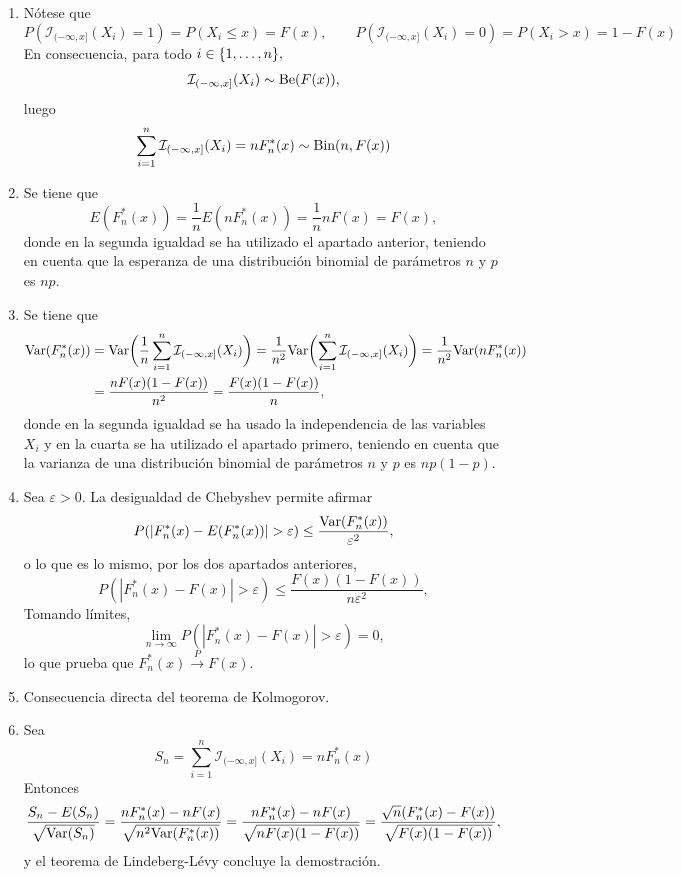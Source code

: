 \documentclass[11pt]{report}
\makeatletter
\renewenvironment{proof}[1][\proofname]{\par
  \pushQED{\qed}%
  \normalfont \topsep\z@skip %
  \trivlist
  \item[\hskip\labelsep
        \itshape
    #1\@addpunct{.}]\ignorespaces
}{%
  \popQED\endtrivlist\@endpefalse
}
\theoremstyle{definition}
\makeatother
\begin{document}
\begin{proof}
\hfill
    \begin{enumerate}
        \item Nótese que
        \[P(\mathcal{I}_{(-\infty,x]}(X_i)=1) = P(X_i \leq x) = F(x), \qquad P(\mathcal{I}_{(-\infty,x]}(X_i)=0) = P(X_i > x) = 1-F(x)\]
        En consecuencia, para todo $i \in \{1,\mathellipsis,n\},$
        \[\mathcal{I}_{(-\infty,x]}(X_i) \sim \textup{Be}(F(x)),\]
        luego
        \[\sum_{i=1}^n\mathcal{I}_{(-\infty,x]}(X_i) = nF_n^*(x) \sim \textup{Bin}(n,F(x))\]
        \item Se tiene que \[E(F_n^*(x)) =\frac{1}{n}E(nF_n^*(x)) = \frac{1}{n}nF(x)=F(x),\]
        donde en la segunda igualdad se ha utilizado el apartado anterior, teniendo en cuenta que la esperanza de una distribución binomial de parámetros $n$ y $p$ es $np$.
        \item Se tiene que \[
        \begin{aligned}[t]
        \textup{Var}(F_n^*(x)) &= \textup{Var}\biggl(\frac{1}{n} \sum_{i=1}^n \mathcal{I}_{(-\infty,x]}(X_i)\biggr) = \frac{1}{n^2}\textup{Var}\biggl(\sum_{i=1}^n \mathcal{I}_{(-\infty,x]}(X_i)\biggr) = \frac{1}{n^2}\textup{Var}(nF_n^*(x)) \\
        &=\frac{nF(x)(1-F(x))}{n^2}= \frac{F(x)(1-F(x))}{n},
        \end{aligned}
        \]
        donde en la segunda igualdad se ha usado la independencia de las variables $X_i$ y en la cuarta se ha utilizado el apartado primero, teniendo en cuenta que la varianza de una distribución binomial de parámetros $n$ y $p$ es $np(1-p)$.
        \item Sea $\varepsilon>0$. La desigualdad de Chebyshev permite afirmar
        \[P(|F_n^*(x)-E(F_n^*(x))|> \varepsilon) \leq \frac{\textup{Var}(F_n^*(x))}{\varepsilon^2},\]
        o lo que es lo mismo, por los dos apartados anteriores,
        \[P(|F_n^*(x)-F(x)|> \varepsilon) \leq \frac{F(x)(1-F(x))}{n\varepsilon^2},\]
        Tomando límites,
        \[\lim_{n \to \infty} P(|F_n^*(x)-F(x)|>\varepsilon) = 0,\]
        lo que prueba que $F_n^*(x) \xrightarrow{P} F(x)$.
        \item Consecuencia directa del teorema de Kolmogorov.
        \item Sea
        \[S_n = \sum_{i=1}^n \mathcal{I}_{(-\infty,x]}(X_i) = nF_n^*(x)\]
        Entonces
        \[\frac{S_n-E(S_n)}{\sqrt{\textup{Var}(S_n)}} = \frac{nF_n^*(x)-nF(x)}{\sqrt{n^2\textup{Var}(F_n^*(x))}} = \frac{nF_n^*(x)-nF(x)}{\sqrt{nF(x)(1-F(x))}} = \frac{\sqrt{n}(F_n^*(x)-F(x))}{\sqrt{F(x)(1-F(x))}},\]
        y el teorema de Lindeberg-Lévy concluye la demostración. \qedhere
    \end{enumerate}
\end{proof}
\end{document}
